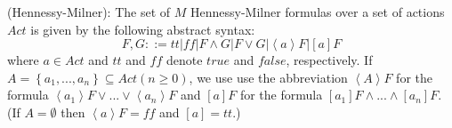 \begin{definition}
(Hennessy-Milner): The set of $M$ Hennessy-Milner formulas over a set of actions $Act$ is given by the following abstract syntax:
\begin{equation*}
  F,G::=tt |ff | F\wedge G | F \vee G|\left\langle a \right\rangle F|\left[ a \right] F
\end{equation*}
where $a \in Act$ and $tt$ and $ff$ denote $true$ and $false$, respectively. 
If $A=\left\{ a_{1},...,a_{n} \right\} \subseteq Act \left( n \geq 0\right)$, 
we use use the abbreviation $\left\langle A \right\rangle F$ for the formula 
$\left\langle a_{1} \right\rangle F \vee ... \vee \left\langle a_{n} \right\rangle F$ and 
$\left[ a \right] F$ for the formula 
$\left[ a_{1} \right] F \wedge ... \wedge \left[ a_{n} \right]F$. 
(If $A=\emptyset$ then $\left\langle a\right\rangle F=ff$ and $\left[a\right] = tt$.)
\end{definition}